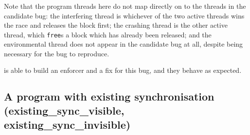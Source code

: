 Note that the program threads here do not map directly on to the
threads in the candidate bug: the interfering thread is whichever of
the two active threads wins the race and releases the block first; the
crashing thread is the other active thread, which \texttt{free}s a
block which has already been released; and the environmental thread
does not appear in the candidate bug at all, despite being necessary
for the bug to reproduce.

{\Implementation} is able to build an enforcer and a fix for this bug,
and they behave as expected.

\subsection{A program with existing synchronisation (existing\_sync\_visible, existing\_sync\_invisible)}

